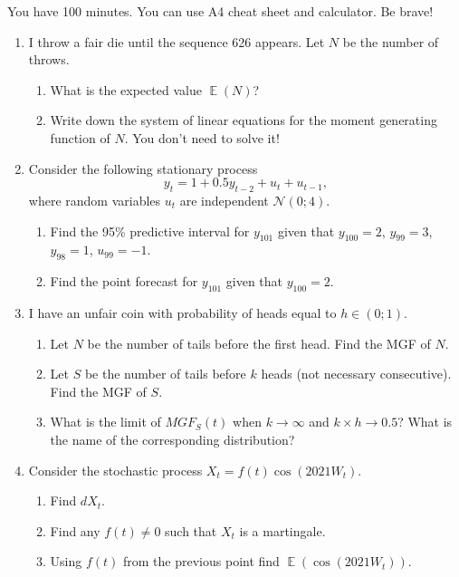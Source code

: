 \documentclass[12pt]{article}
\DeclareMathOperator{\E}{\mathbb{E}}
\newcommand{\cN}{\mathcal{N}}
\begin{document}
You have 100 minutes. You can use A4 cheat sheet and calculator. Be brave! 


\begin{enumerate}

\item I throw a fair die until the sequence 626 appears. Let $N$ be the number of throws.
\begin{enumerate}
    \item What is the expected value $\E(N)$?
    \item Write down the system of linear equations for the moment generating function of $N$. You don't need to solve it!
\end{enumerate}
    

\item Consider the following stationary process
\[
y_t = 1 + 0.5 y_{t-2} + u_t + u_{t-1},    
\]
where random variables $u_t$ are independent $\cN(0; 4)$.

\begin{enumerate}
    \item Find the 95\% predictive interval for $y_{101}$ given that $y_{100} = 2$, $y_{99} = 3$, $y_{98} = 1$, $u_{99} = -1$.
    \item Find the point forecast for $y_{101}$ given that $y_{100}=2$.
\end{enumerate}


\item I have an unfair coin with probability of heads equal to $h \in (0;1)$.
\begin{enumerate}
    \item Let $N$ be the number of tails before the first head. Find the MGF of $N$.
    \item Let $S$ be the number of tails before $k$ heads (not necessary consecutive). Find the MGF of $S$.
    \item What is the limit of $MGF_S(t)$ when $k \to \infty$ and $k \times h \to 0.5$? What is the name of the corresponding distribution?
\end{enumerate}


\item Consider the stochastic process $X_t = f(t) \cos (2021 W_t)$.
\begin{enumerate}
    \item Find $dX_t$.
    \item Find any $f(t) \neq 0$ such that $X_t$ is a martingale.
    \item Using $f(t)$ from the previous point find $\E(\cos (2021 W_t))$.
\end{enumerate}




\end{enumerate}
\end{document}
